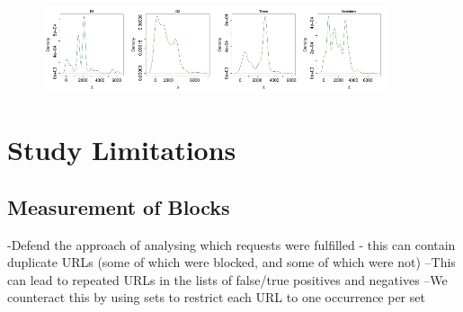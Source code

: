 \documentclass{bmcart}
\begin{document}
\begin{figure}[h!]
\includegraphics[width=0.2249\textwidth]{imgs/EE-unblock-dist}\includegraphics[width=0.2249\textwidth]{imgs/O2-unblock-dist}\includegraphics[width=0.2249\textwidth]{imgs/Three-unblock-dist}\includegraphics[width=0.2249\textwidth]{imgs/Vodafone-unblock-dist}

\label{fig:isps-unblock-dist}
\end{figure}



\section*{Study Limitations}


\subsection*{Measurement of Blocks}
-Defend the approach of analysing which requests were fulfilled - this can contain duplicate URLs (some of which were blocked, and some of which were not)
--This can lead to repeated URLs in the lists of false/true positives and negatives
--We counteract this by using sets to restrict each URL to one occurrence per set
\end{document}
